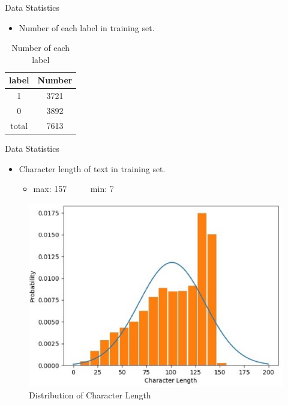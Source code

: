 \documentclass[
 size=14pt,
 paper=smartboard,  %
 mode=present, 		%
 display=slides, 	%
 style=tuliplab,  	%
 pauseslide,
 fleqn,leqno]{powerdot}
\begin{document}
\begin{slide}{Data Statistics}
\bigskip \bigskip
\begin{itemize}
	\item
	Number of each label in training set.
\end{itemize}
\begin{table}[htbp]
	\setlength{\abovecaptionskip}{0pt}
	\setlength{\belowcaptionskip}{10pt}
	\centering
	\caption{Number of each label}
	
	\begin{tabular}{cc}
		\hline
		    label             & Number     \\
		\hline
		1     & 3721                \\
		 0          & 3892                        \\
		\hline
		total  &  7613 \\
				\hline
	\end{tabular}
\end{table}

\end{slide}



\begin{slide}[toc=,bm=]{Data Statistics}
	\begin{itemize}
		\item
		Character length of text in training set.
			\begin{itemize}
			\item
			max: 157 \ \ \ \ \ min: 7
		\end{itemize}
	\end{itemize}


	\begin{figure}
		\centering
		\includegraphics[scale=0.6]{character dist.eps}
		\caption{Distribution of Character Length}
	\end{figure}
\end{slide}
\end{document}
